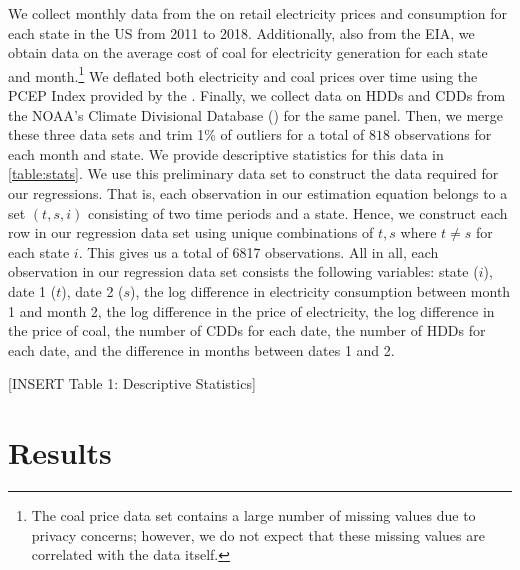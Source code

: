 \documentclass[11pt,a4paper,leqno]{extarticle}
\begin{document}
	
	We collect monthly data from the \cite{EIANetgen} on retail electricity prices and consumption for each state in the US from 2011 to 2018. Additionally, also from the EIA, we obtain data on the average cost of coal for electricity generation for each state and month.\footnote{ The coal price data set contains a large number of missing values due to privacy concerns; however, we do not expect that these missing values are correlated with the data itself.} We deflated both electricity and coal prices over time using the PCEP Index provided by the  \cite{USBEA}. Finally, we collect data on HDDs and CDDs from the NOAA's Climate Divisional Database (\citeyear{nCLIMDIV}) for the same panel. Then, we merge these three data sets and trim 1\% of outliers for a total of $818$ observations for each month and state. We provide descriptive statistics for this data in \autoref{table:stats}. We use this preliminary data set to construct the data required for our regressions. That is, each observation in our estimation equation belongs to a set $(t,s,i)$ consisting of two time periods and a state. Hence, we construct each row in our regression data set using unique combinations of $t,s$ where $t \neq s$ for each state $i$. This gives us a total of 6817 observations.  All in all, each observation in our regression data set consists the following variables: state ($i$), date 1 ($t$), date 2 ($s$), the log difference in electricity consumption between month 1 and month 2, the log difference in the price of electricity, the log difference in the price of coal, the number of CDDs for each date, the number of HDDs for each date, and the difference in months between dates 1 and 2. 
	
	\vspace{0.15in}
	\begin{center}
		[INSERT Table 1: Descriptive Statistics]
	\end{center}
	\vspace{0.15in}
	

	
	
	\section{Results}
	\label{sec:results}
	
	
	
	
	
	
	
\end{document}
